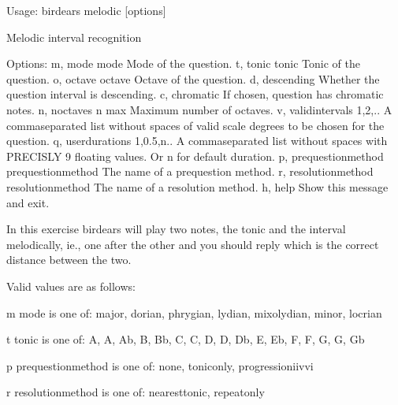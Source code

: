 \documentclass[letterpaper,10pt,english]{sphinxmanual}
\begin{document}
\begin{sphinxVerbatim}[commandchars=\\\{\}]
Usage: birdears melodic [options]

  Melodic interval recognition

Options:
  \PYGZhy{}m, \PYGZhy{}\PYGZhy{}mode \PYGZlt{}mode\PYGZgt{}               Mode of the question.
  \PYGZhy{}t, \PYGZhy{}\PYGZhy{}tonic \PYGZlt{}tonic\PYGZgt{}             Tonic of the question.
  \PYGZhy{}o, \PYGZhy{}\PYGZhy{}octave \PYGZlt{}octave\PYGZgt{}           Octave of the question.
  \PYGZhy{}d, \PYGZhy{}\PYGZhy{}descending                Whether the question interval is descending.
  \PYGZhy{}c, \PYGZhy{}\PYGZhy{}chromatic                 If chosen, question has chromatic notes.
  \PYGZhy{}n, \PYGZhy{}\PYGZhy{}n\PYGZus{}octaves \PYGZlt{}n max\PYGZgt{}         Maximum number of octaves.
  \PYGZhy{}v, \PYGZhy{}\PYGZhy{}valid\PYGZus{}intervals \PYGZlt{}1,2,..\PYGZgt{}  A comma\PYGZhy{}separated list without spaces
                                  of valid scale degrees to be chosen for the
                                  question.
  \PYGZhy{}q, \PYGZhy{}\PYGZhy{}user\PYGZus{}durations \PYGZlt{}1,0.5,n..\PYGZgt{}
                                  A comma\PYGZhy{}separated list without
                                  spaces with PRECISLY 9 floating values. Or
                                  \PYGZsq{}n\PYGZsq{} for default              duration.
  \PYGZhy{}p, \PYGZhy{}\PYGZhy{}prequestion\PYGZus{}method \PYGZlt{}prequestion\PYGZus{}method\PYGZgt{}
                                  The name of a pre\PYGZhy{}question method.
  \PYGZhy{}r, \PYGZhy{}\PYGZhy{}resolution\PYGZus{}method \PYGZlt{}resolution\PYGZus{}method\PYGZgt{}
                                  The name of a resolution method.
  \PYGZhy{}h, \PYGZhy{}\PYGZhy{}help                      Show this message and exit.

  In this exercise birdears will play two notes, the tonic and the interval
  melodically, ie., one after the other and you should reply which is the
  correct distance between the two.

  Valid values are as follows:

  \PYGZhy{}m \PYGZlt{}mode\PYGZgt{} is one of: major, dorian, phrygian, lydian, mixolydian, minor,
  locrian

  \PYGZhy{}t \PYGZlt{}tonic\PYGZgt{} is one of: A, A\PYGZsh{}, Ab, B, Bb, C, C\PYGZsh{}, D, D\PYGZsh{}, Db, E, Eb, F, F\PYGZsh{}, G,
  G\PYGZsh{}, Gb

  \PYGZhy{}p \PYGZlt{}prequestion\PYGZus{}method\PYGZgt{} is one of: none, tonic\PYGZus{}only, progression\PYGZus{}i\PYGZus{}iv\PYGZus{}v\PYGZus{}i

  \PYGZhy{}r \PYGZlt{}resolution\PYGZus{}method\PYGZgt{} is one of: nearest\PYGZus{}tonic, repeat\PYGZus{}only
\end{sphinxVerbatim}
\end{document}
